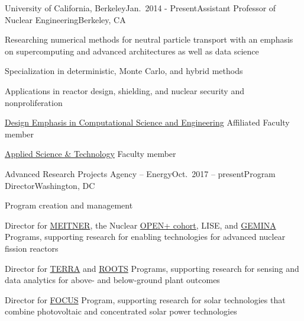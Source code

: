 \begin{rSubsection}{University of California, Berkeley}{Jan.\ 2014 - Present}{Assistant Professor of Nuclear Engineering}{Berkeley, CA}
\item Researching numerical methods for neutral particle transport with an emphasis on supercomputing and advanced architectures as well as data science
\item Specialization in deterministic, Monte Carlo, and hybrid methods
\item Applications in reactor design, shielding, and nuclear security and nonproliferation
\item \href{http://citris-uc.org/decse-mission/}{Design Emphasis  in Computational Science and Engineering} Affiliated Faculty member
\item \href{http://ast.coe.berkeley.edu/}{Applied Science \& Technology} Faculty member
\end{rSubsection}


\begin{rSubsection}{Advanced Research Projects Agency -- Energy}{Oct.\ 2017 -- present}{Program Director}{Washington, DC}
\item Program creation and management
\item Director for \href{https://arpa-e.energy.gov/?q=arpa-e-programs/meitner}{MEITNER}, the Nuclear \href{https://arpa-e.energy.gov/?q=news-item/arpa-e-announces-12-million-five-projects-nuclear-materials-science}{OPEN+ cohort}, LISE, and  \href{https://arpa-e.energy.gov/?q=workshop/optimal-operations-advanced-nuclear-reactors}{GEMINA} Programs, supporting research for enabling technologies for advanced nuclear fission reactors
\item Director for \href{https://arpa-e.energy.gov/?q=arpa-e-programs/terra}{TERRA} and \href{https://arpa-e.energy.gov/?q=arpa-e-programs/roots}{ROOTS} Programs, supporting research for sensing and data analytics for above- and below-ground plant outcomes
\item Director for \href{https://arpa-e.energy.gov/?q=arpa-e-programs/focus}{FOCUS} Program, supporting research for solar technologies that combine photovoltaic and concentrated solar power technologies
\end{rSubsection}



